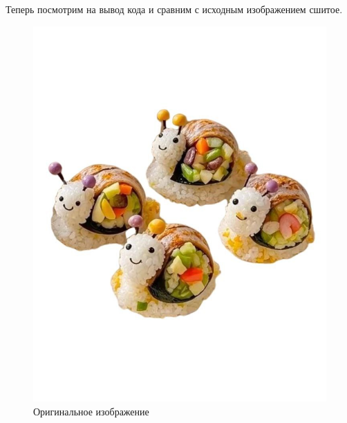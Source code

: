\documentclass[a4paper,12pt]{article}
\begin{document}
Теперь посмотрим на вывод кода и сравним с исходным изображением сшитое.
\begin{figure}[H]
    \centering
    \begin{minipage}{0.48\textwidth}
        \centering
        \includegraphics[width=\linewidth]{lab2/task3/orig.jpg}
        \caption{Оригинальное изображение}
        \label{fig:reflect_ox}
    \end{minipage}
    \hfill
    \begin{minipage}{0.48\textwidth}
        \centering

\end{minipage}
\end{figure}
\end{document}
